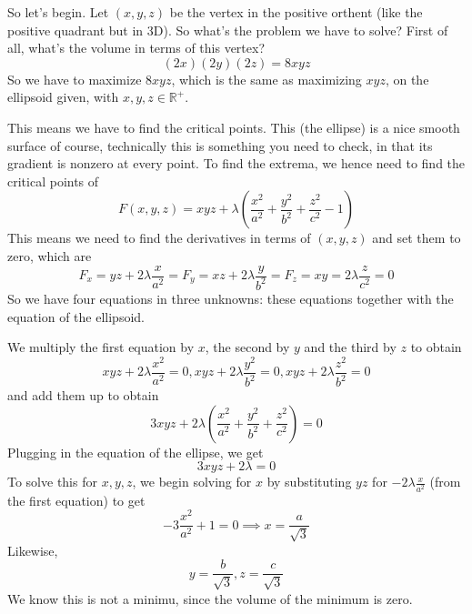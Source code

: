 \documentclass{article}
\newcommand{\reals}[0]{\mathbb{R}}
\begin{document}
\begin{enumerate}
  So let's begin. Let \((x, y, z)\) be the vertex in the positive orthent (like the positive quadrant but in 3D). So what's the problem we have to solve? First of all, what's the volume in terms of this vertex?
  \begin{equation}(2x)(2y)(2z) = 8xyz\end{equation}
  So we have to maximize \(8xyz\), which is the same as maximizing \(xyz\), on the ellipsoid  given, with \(x, y, z \in \reals^+\).

  This means we have to find the critical points. This (the ellipse) is a nice smooth surface of course, technically this is something you need to check, in that its gradient is nonzero at every point. To find the extrema, we hence need to find the critical points of
  \begin{equation}F(x, y, z) = xyz + \lambda\left(\frac{x^2}{a^2} + \frac{y^2}{b^2} + \frac{z^2}{c^2} - 1\right)\end{equation}
  This means we need to find the derivatives in terms of \((x, y, z)\) and set them to zero, which are
  \begin{equation}F_x = yz + 2\lambda\frac{x}{a^2} = F_y = xz + 2\lambda\frac{y}{b^2} = F_z = xy = 2\lambda\frac{z}{c^2} = 0\end{equation}
  So we have four equations in three unknowns: these equations together with the equation of the ellipsoid.

  We multiply the first equation by \(x\), the second by \(y\) and the third by \(z\) to obtain
  \begin{equation}xyz + 2\lambda\frac{x^2}{a^2} = 0, xyz + 2\lambda\frac{y^2}{b^2} = 0, xyz + 2\lambda\frac{z^2}{b^2} = 0\end{equation}
  and add them up to obtain
  \begin{equation}3xyz + 2\lambda\left(\frac{x^2}{a^2} + \frac{y^2}{b^2} + \frac{z^2}{c^2}\right) = 0\end{equation}
  Plugging in the equation of the ellipse, we get
  \begin{equation}3xyz + 2\lambda = 0\end{equation}
  To solve this for \(x, y, z\), we begin solving for \(x\) by substituting \(yz\) for \(-2\lambda\frac{x}{a^2}\) (from the first equation) to get
  \begin{equation}-3\frac{x^2}{a^2} + 1 = 0 \implies x = \frac{a}{\sqrt{3}}\end{equation}
  Likewise,
  \begin{equation}y = \frac{b}{\sqrt{3}}, z = \frac{c}{\sqrt{3}}\end{equation}
  We know this is not a minimu, since the volume of the minimum is zero.

\end{enumerate}
\end{document}
